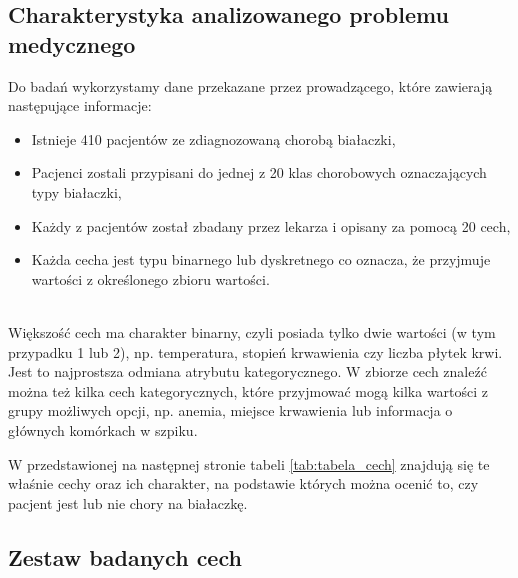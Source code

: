 \documentclass{article}
\begin{document}
\subsection{Charakterystyka analizowanego problemu medycznego}
\quad Do badań wykorzystamy dane przekazane przez prowadzącego, które zawierają następujące informacje:
\begin{itemize}{}
    \item Istnieje 410 pacjentów ze zdiagnozowaną chorobą białaczki,
    \item Pacjenci zostali przypisani do jednej z 20 klas chorobowych oznaczających typy białaczki,
    \item Każdy z pacjentów został zbadany przez lekarza i opisany za pomocą 20 cech,
    \item Każda cecha jest typu binarnego lub dyskretnego co oznacza, że przyjmuje wartości z określonego zbioru wartości.\\\\
\end{itemize}

Większość cech ma charakter binarny, czyli posiada tylko dwie wartości (w tym przypadku 1 lub 2), np. temperatura, stopień krwawienia czy liczba płytek krwi. Jest to najprostsza odmiana atrybutu kategorycznego. W zbiorze cech znaleźć można też kilka cech kategorycznych, które przyjmować mogą kilka wartości z grupy możliwych opcji, np. anemia, miejsce krwawienia lub informacja o głównych komórkach w szpiku.

W przedstawionej na następnej stronie tabeli \ref{tab:tabela_cech} znajdują się te właśnie cechy oraz ich charakter, na podstawie których można ocenić to, czy pacjent jest lub nie chory na białaczkę.

\newpage

\subsection{Zestaw badanych cech}
\end{document}
